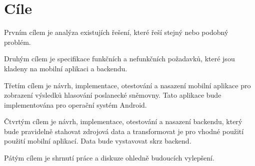 \chapter{Cíle}

\setcounter{page}{1}

Prvním cílem je analýza existujích řešení, které řeší stejný nebo podobný problém.

Druhým cílem je specifikace funkčních a nefunkčních požadavků, které jsou kladeny na mobilní aplikaci a backendu.

Třetím cílem je návrh, implementace, otestování a nasazení mobilní aplikace pro zobrazení výsledků hlasování poslanecké sněmovny. Tato aplikace bude implementována pro operační systém Android. 

Čtvrtým cílem je návrh, implementace, otestování a nasazení backendu, který bude pravidelně stahovat zdrojová data a transformovat je pro vhodné použití použití mobilní aplikací. Data bude vystavovat skrz backend.

Pátým cílem je shrnutí práce a diskuze ohledně budoucích vylepšení.